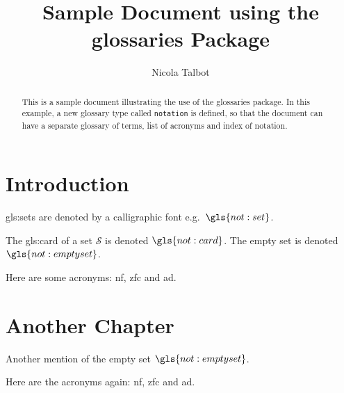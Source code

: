 \documentclass{report}
\begin{document}
\title{Sample Document using the glossaries Package}
\author{Nicola Talbot}
\maketitle

\begin{abstract}
This is a sample document illustrating the use of the
\textsf{glossaries} package.  In this example, a new glossary type
called \texttt{notation} is defined, so that the document can have a
separate glossary of terms, list of acronyms and index of notation.
\end{abstract}

\tableofcontents

\printglossaries

\chapter{Introduction}

\Glspl{gls:set} are denoted by a calligraphic font
e.g.\ $\gls{not:set}$.

The \gls{gls:card} of a set $\mathcal{S}$ is denoted
$\gls{not:card}$. The empty set is denoted
$\gls{not:emptyset}$.

Here are some acronyms: \gls{nf}, \gls{zfc} and \gls{ad}.

\chapter{Another Chapter}

Another mention of the empty set $\gls{not:emptyset}$.

Here are the acronyms again: \gls{nf}, \gls{zfc} and \gls{ad}.
\end{document}

